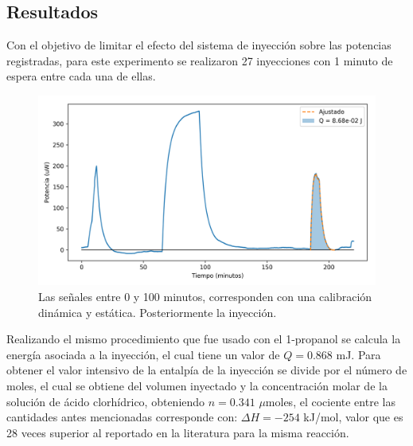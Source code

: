 \subsection{Resultados}
	Con el objetivo de limitar el efecto del sistema de inyecci\'on sobre las potencias registradas, para este experimento se realizaron 27 inyecciones con 1 minuto de espera entre cada una de ellas.
	\begin{figure}[h]
		\centering
		\includegraphics[width=\linewidth]{../Data/ChemicalCalibrations/HCl}
		\caption{Las se\~nales entre 0 y 100 minutos, corresponden con una calibraci\'on din\'amica y est\'atica. Posteriormente la inyecci\'on.}
		\label{fig: HClResults}
	\end{figure}

	Realizando el mismo procedimiento que fue usado con el 1-propanol se calcula la energía asociada a la inyecci\'on, el cual tiene un valor de $Q = 0.868$ mJ. Para obtener el valor intensivo de la entalp\'ia de la inyecci\'on se divide por el n\'umero de moles, el cual se obtiene del volumen inyectado y la concentraci\'on molar de la soluci\'on de \'acido clorh\'idrico, obteniendo $n = 0.341$ $\mu$moles, el cociente entre las cantidades antes mencionadas corresponde con: $\Delta H = -254$ kJ/mol, valor que es 28 veces superior al reportado en la literatura para la misma reacci\'on.  
	
